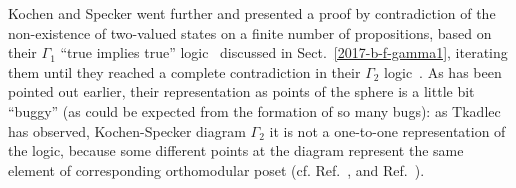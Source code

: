 Kochen and Specker went further and presented a  proof by contradiction
of the non-existence of two-valued states on a finite number of propositions,
based on their  $\Gamma_1$ ``true implies true'' logic~\cite[p.~68]{kochen1} discussed in Sect.~\ref{2017-b-f-gamma1},
iterating them until they reached a complete contradiction in their $\Gamma_2$ logic~\cite[p.~69]{kochen1}.
As has been pointed out earlier, their representation as points of the sphere is a little bit ``buggy'' (as could be expected from the formation of so many bugs):
as Tkadlec has observed, Kochen-Specker diagram $\Gamma_2$ it is not a one-to-one representation of the logic, because some different points
at the diagram represent the same element of corresponding orthomodular
poset (cf. Ref.~\cite[p.~5390]{svozil-tkadlec}, and Ref.~\cite[p.]{tkadlec-01}).

